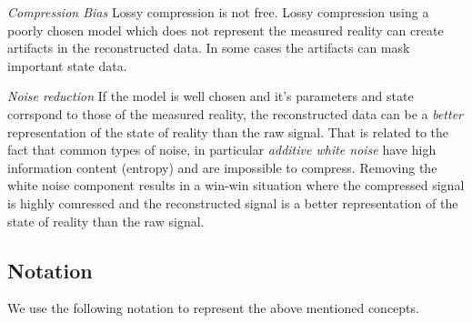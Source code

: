 \emph{Compression Bias} Lossy compression is not free. Lossy
compression using a poorly chosen model which does not represent the
measured reality can create artifacts in the reconstructed data. In
some cases the artifacts can mask important state data.

\emph{Noise reduction} If the model is well chosen and it's parameters
and state corrspond to those of the measured reality, the
reconstructed data can be a {\em better } representation of the state
of reality than the raw signal. That is related to the fact that
common types of noise, in particular {\em additive white noise} have high
information content (entropy) and are impossible to compress. Removing
the white noise component results in a win-win situation where the
compressed signal is highly comressed and the reconstructed signal is
a better representation of the state of reality than the raw signal.

\subsection{Notation}

We use the following notation to represent the above mentioned
concepts.

\newcommand{\cM}{{\cal M}}
\newcommand{\cSM}{{\cal SM}}

